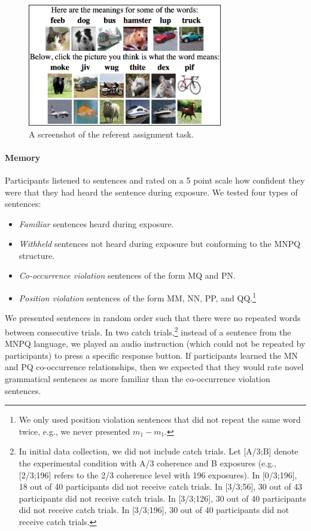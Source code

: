\documentclass[man,longtable,floatsintext]{my-apa6}
\begin{document}
\begin{figure}[t]
  \begin{center}
    \includegraphics[width=8.5cm]{meaning-html-cropped.png}
    \caption{A screenshot of the referent assignment task.}
    \label{meaning-task}
  \end{center}
\end{figure}

\paragraph{Memory}
Participants listened to sentences and rated on a 5 point scale how confident they were that they had heard the sentence during exposure. We tested four types of sentences:

\begin{itemize}
\item \emph{Familiar} sentences heard during exposure.
\item \emph{Withheld} sentences not heard during exposure but conforming to the MNPQ structure.
\item \emph{Co-occurrence violation} sentences of the form MQ and PN.
\item \emph{Position violation} sentences of the form MM, NN, PP, and QQ.\footnote{ We only used position violation sentences that did not repeat the same word twice, e.g., we never presented $m_1 - m_1$.}
\end{itemize}

We presented sentences in random order such that there were no repeated words between consecutive trials. In two catch trials,\footnote{\label{catch-trials} In initial data collection, we did not include catch trials.  Let [A/3;B] denote the experimental condition with A/3 coherence and B exposures (e.g., [2/3;196] refers to the 2/3 coherence level with 196 exposures). In [0/3;196], 18 out of 40 participants did not receive catch trials. In [3/3;56], 30 out of 43 participants did not receive catch trials. In [3/3;126], 30 out of 40 participants did not receive catch trials. In [3/3;196], 30 out of 40 participants did not receive catch trials.} instead of a sentence from the MNPQ language, we played an audio instruction (which could not be repeated by participants) to press a specific response button.  If participants learned the MN and PQ co-occurrence relationships, then we expected that they would rate novel grammatical sentences as more familiar than the co-occurrence violation sentences.
\end{document}

